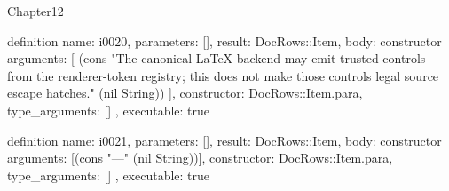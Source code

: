 \begin{lexlean}{Chapter12}
\begin{semanticmodule}
definition{
  name: i0020,
  parameters: [],
  result: DocRows::Item,
  body: constructor{
    arguments: [
      (cons "The canonical LaTeX backend may emit trusted controls from the renderer-token registry; this does not make those controls legal source escape hatches." (nil String))
    ],
    constructor: DocRows::Item.para,
    type_arguments: []
  },
  executable: true
}

definition{
  name: i0021,
  parameters: [],
  result: DocRows::Item,
  body: constructor{
    arguments: [(cons "---" (nil String))],
    constructor: DocRows::Item.para,
    type_arguments: []
  },
  executable: true
}
\end{semanticmodule}
\end{lexlean}
